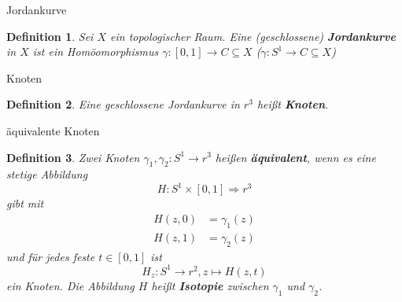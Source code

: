 \documentclass[mycards,frame]{flashcards}
\theoremstyle{break}
\newtheorem{definition}{Definition}
\begin{document}
\begin{flashcard}{Jordankurve}
\begin{definition}
    Sei $X$ ein topologischer Raum. Eine (geschlossene)
    \textbf{Jordankurve} in $X$ ist ein Homöomorphismus 
    $\gamma: [0, 1] \rightarrow C \subseteq X$
    ($\gamma: S^1 \rightarrow C \subseteq X$)
\end{definition}
\end{flashcard}

\begin{flashcard}{Knoten}
\begin{definition}
    Eine geschlossene Jordankurve in $r^3$ heißt \textbf{Knoten}.
\end{definition}
\end{flashcard}

\begin{flashcard}{äquivalente Knoten}
\begin{definition}
    Zwei Knoten $\gamma_1, \gamma_2: S^1 \rightarrow r^3$ heißen
    \textbf{äquivalent}, wenn es eine stetige Abbildung
    \[H: S^1 \times [0,1] \Rightarrow r^3\]
    gibt mit 
    \begin{align*}
        H(z,0) &= \gamma_1(z)\\
        H(z,1) &= \gamma_2(z)
    \end{align*}
    und für jedes
    feste $t \in [0,1]$ ist 
    \[H_z: S^1 \rightarrow r^2, z \mapsto H(z,t)\]
    ein Knoten. Die Abbildung $H$ heißt \textbf{Isotopie} zwischen
    $\gamma_1$ und $\gamma_2$.
\end{definition}
\end{flashcard}
\end{document}
